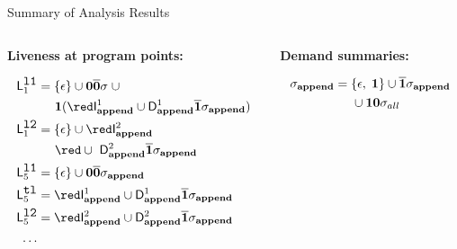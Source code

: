 \begin{frame}[t]{Summary of Analysis Results}
\scriptsize

\begin{columns}[c]
  \begin{column}[T]{0.33\textwidth}
\vspace*{1.5cm}
\centerline{\bf Liveness at program points:}
  \begin{align*}
    \Lanv{1}{\lista} &= \{\epsilon\} \cup  \acar\bcar\sigma\; \cup \\
    &\;\;\;\;\;\acdr({\red \Uf{\append}{1} \cup \Df{\append}{1}\bcdr\sigma_{\append}})\\
    \Lanv{1}{\listb} &= \{\epsilon\} \cup {\red \Uf{\append}{2}}\\
    &\;\;\;\;\;{\red  \cup\  \Df{\append}{2}\bcdr\sigma_{\append}}\\
    \Lanv{5}{\lista} &= \{\epsilon\} \cup  \acar\bcar\sigma_{\append}\\
    \Lanv{5}{\xtl} &= {\red \Uf{\append}{1} \cup \Df{\append}{1}\bcdr\sigma_{\append}}\\
    \Lanv{5}{\listb} &= {\red \Uf{\append}{2} \cup \Df{\append}{2}\bcdr\sigma_{\append}}\\
    \ldots\\
  \end{align*}
  \end{column}
\begin{column}[T]{0.33\textwidth}
\vspace*{1.5cm}
\centerline{\bf Demand summaries:}
     \begin{align*}
       \sigma_{\mathbf{append}} &= \{\epsilon, \; \mathbf{1}\} \cup
       \overline{\mathbf{1}}\sigma_{\mathbf{append}}\\
       & \;\;\;\;\;\cup  \mathbf{1}\mathbf{0}\sigma_{all}
     \end{align*}

\end{column}
\end{columns}
\end{frame}
